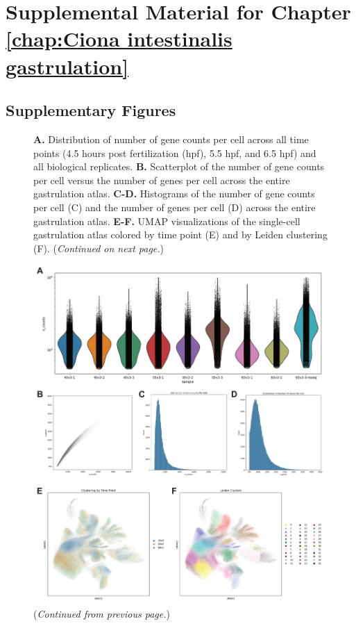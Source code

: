 \chapter{Supplemental Material for Chapter \ref{chap:Ciona intestinalis gastrulation}}

\section{Supplementary Figures}

\begin{figure}[h]
    \centering
    \caption[Quality control of the \textit{Ciona} single-cell gastrulation atlas]{\textbf{A.} Distribution of number of gene counts per cell across all time points (4.5 hours post fertilization (hpf), 5.5 hpf, and 6.5 hpf) and all biological replicates. \textbf{B.} Scatterplot of the number of gene counts per cell versus the number of genes per cell across the entire gastrulation atlas. \textbf{C-D.} Histograms of the number of gene counts per cell (C) and the number of genes per cell (D) across the entire gastrulation atlas. \textbf{E-F.} UMAP visualizations of the single-cell gastrulation atlas colored by time point (E) and by Leiden clustering (F). (\textit{Continued on next page.})}
    \label{fig:quality control single cell atlas}
\end{figure}

\addtocounter{figure}{-1}

\captionsetup[figure]{list=no}
\begin{figure}[p]
    \includegraphics[scale=.73]{4_figures-and-files/FigS1_Quality-Control-Metrics.png}
    \caption{(\textit{Continued from previous page.})}
\end{figure}
\captionsetup[figure]{list=yes}
